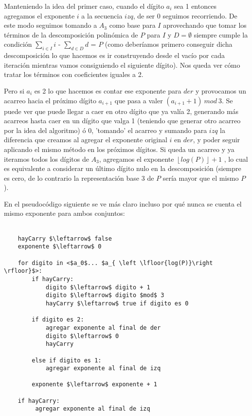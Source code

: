 	Manteniendo la idea del primer caso, cuando el dígito $a_i$ sea 1 entonces agregamos el exponente $i$ a la secuencia $izq$, de ser 0 seguimos recorriendo. De este modo seguimos tomando a $A_3$ como base para $I$ aprovechando que tomar los términos de la descomposición polinómica de $P$ para $I$ y $D = \emptyset$ siempre cumple la condición $\sum_{i \in I} i$ - $\sum_{d \in D} d$ = $P$ (como deberíamos primero conseguir dicha descomposición lo que hacemos es ir construyendo desde el vacío por cada iteración mientras vamos consiguiendo el siguiente dígito). Nos queda ver cómo tratar los términos con coeficientes iguales a 2.

	Pero si $a_i$ es 2 lo que hacemos es contar ese exponente para $der$ y provocamos un acarreo hacia el próximo dígito $a_{i+1}$ que pasa a valer $(a_{i+1} + 1) \ mod \ 3$. Se puede ver que puede llegar a caer en otro dígito que ya valía 2, generando más acarreos hasta caer en un dígito que valga 1 (teniendo que generar otro acarreo por la idea del algoritmo) ó 0, 'tomando' el acarreo y sumando para $izq$ la diferencia que creamos al agregar el exponente original $i$ en $der$, y poder seguir aplicando el mismo método en los próximos dígitos. Si queda un acarreo y ya iteramos todos los dígitos de $A_3$, agregamos el exponente $\left \lfloor{log(P)}\right \rfloor + 1$ , lo cual es equivalente a considerar un último dígito nulo en la descomposición (siempre es cero, de lo contrario la representación base 3 de $P$ sería mayor que el mismo $P$).

 	En el pseudocódigo siguiente se ve más claro incluso por qué nunca se cuenta el mismo exponente para ambos conjuntos:
\\
\\
\begin{lstlisting}
    hayCarry $\leftarrow$ false
    exponente $\leftarrow$ 0

    for digito in <$a_0$... $a_{ \left \lfloor{log(P)}\right \rfloor}$>:
        if hayCarry:
            digito $\leftarrow$ digito + 1
            digito $\leftarrow$ digito $mod$ 3
            hayCarry $\leftarrow$ true if digito es 0

        if digito es 2:
            agregar exponente al final de der
            digito $\leftarrow$ 0
            hayCarry

        else if digito es 1:
            agregar exponente al final de izq

        exponente $\leftarrow$ exponente + 1

    if hayCarry:
         agregar exponente al final de izq

\end{lstlisting}


